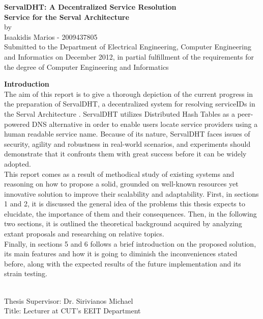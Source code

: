 \documentclass[12pt,a4paper,oneside]{article}
\begin{document}



\pagestyle{plain}
\setcounter{page}{1}


\begin{center}
{\large {\bf  ServalDHT: A Decentralized Service Resolution\\ Service for the Serval Architecture}\\[0.5cm] by \\[0.5cm] Isaakidis Marios - 2009437805}
 ~\\[0.5cm]
Submitted to the Department of Electrical Engineering, Computer Engineering and Informatics on December 2012, in partial fulfillment of the requirements for the degree of Computer Engineering and Informatics
\end{center}

\vfill

{\Large \bf \noindent Introduction} \\[0.5cm]
The aim of this report is to give a thorough depiction of the current progress in the preparation of ServalDHT, a decentralized system for resolving serviceIDs in the Serval Architecture \cite{Nordstrom2012}. ServalDHT utilizes Distributed Hash Tables as a peer-powered DNS alternative in order to enable users locate service providers using a human readable service name. Because of its nature, ServalDHT faces issues of security, agility and robustness in real-world scenarios, and experiments should demonstrate that it confronts them with great success before it can be widely adopted.\\
\indent This report comes as a result of methodical study of existing systems and reasoning on how to propose a solid, grounded on well-known resources yet innovative solution to improve their scalability and adaptability. First, in sections 1 and 2, it is discussed the general idea of the problems this thesis expects to elucidate, the importance of them and their consequences. Then, in the following two sections, it is outlined the theoretical background acquired by analyzing extant proposals and researching on relative topics.\\
\indent Finally, in sections 5 and 6 follows a brief introduction on the proposed solution, its main features and how it is going to diminish the inconveniences stated before, along with the expected results of the future implementation and its strain testing.

~\\[0.5cm]
{\large
\noindent Thesis Supervisor: Dr. Sirivianos Michael\\
\noindent Title: Lecturer at CUT's EEIT Department}
\end{document}
